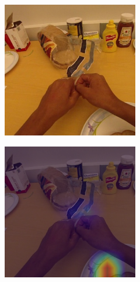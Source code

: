 \documentclass[10pt,twocolumn,hidelinks,letterpaper]{article}
\begin{document}
\begin{figure}[t]
  \centering
  \begin{subfigure}{.32\linewidth}
  	\includegraphics[width=\linewidth]{images/Cams2/S2-take_hotdog/rgb0057.png}
  \end{subfigure}
  \begin{subfigure}{.32\linewidth}
  	\includegraphics[width=\linewidth]{images/Cams2/S2-take_hotdog/rgb0057_CAM.png}

\end{subfigure}
\end{figure}
\end{document}
